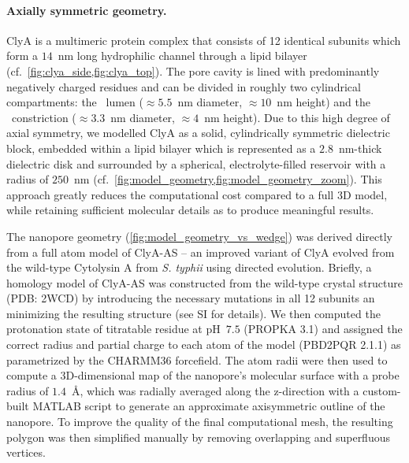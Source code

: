 \documentclass[journal=ancac3,manuscript=article,etalmode=truncate,maxauthors=0,layout=twocolumn]{achemso}
\begin{document}
\paragraph{Axially symmetric geometry.}
ClyA is a multimeric protein complex that consists of 12 identical subunits which form a $14$~nm long
hydrophilic channel through a lipid bilayer (cf.~\cref{fig:clya_side,fig:clya_top}). The pore cavity is lined
with predominantly negatively charged residues and can be divided in roughly two cylindrical compartments:
the \cis\ lumen ($\approx5.5$~nm diameter, $\approx10$~nm height) and the \trans\ constriction
($\approx3.3$~nm diameter, $\approx4$~nm height). Due to this high degree of axial symmetry, we modelled ClyA
as a solid, cylindrically symmetric dielectric block, embedded within a lipid bilayer which is represented as
a $2.8$~nm-thick\cite{Kucerka-2011} dielectric disk  and surrounded by a spherical, electrolyte-filled
reservoir with a radius of $250$~nm
(cf.~\cref{fig:model_geometry,fig:model_geometry_zoom})\cite{Lu-2012,Pederson-2015}. This approach greatly
reduces the computational cost compared to a full 3D model, while retaining sufficient molecular details as
to produce meaningful results.

The nanopore geometry (\cref{fig:model_geometry_vs_wedge}) was derived directly from a full atom model of
ClyA-AS -- an improved variant of ClyA evolved from the wild-type Cytolysin A from \textit{S. typhii} using
directed evolution.\cite{Soskine-2013} Briefly, a homology model of ClyA-AS was constructed from the
wild-type crystal structure (PDB: 2WCD)\cite{Mueller-2009} by introducing the necessary mutations in all 12
subunits an minimizing the resulting structure (see SI for details). We then computed the protonation state
of titratable residue at pH~$7.5$ (PROPKA 3.1\cite{Olsson-2011}) and assigned the correct radius and partial
charge to each atom of the model (PBD2PQR 2.1.1\cite{Jurrus-2018}) as parametrized by the CHARMM36
forcefield.\cite{Best-2012} The atom radii were then used to compute a 3D-dimensional map of the
nanopore's molecular surface with a probe radius of $1.4$~\AA, which was radially averaged along the
z-direction with a custom-built MATLAB script to generate an approximate axisymmetric outline of the
nanopore. To improve the quality of the final computational mesh, the resulting polygon was then simplified
manually by removing overlapping and superfluous vertices.
\end{document}
